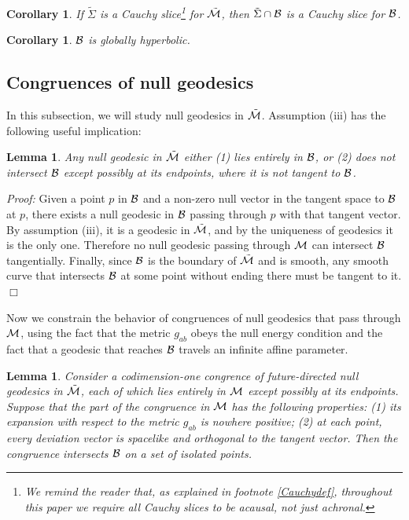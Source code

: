 \documentclass[12pt]{article}
\def\bulk{{\cal M}}
\def\bdy{{\cal B}}
\def\overM{\tilde \bulk}
\newtheorem{lemma}[theorem]{Lemma}
\newtheorem{corollary}[theorem]{Corollary}
\begin{document}
\begin{corollary}\label{boundaryCauchy} If $\tilde\Sigma$ is a Cauchy slice\footnote{ We remind the reader that, as explained in footnote \ref{Cauchydef}, throughout this paper we require all Cauchy slices to be acausal, not just achronal.} for $\overM$, then $\tilde\Sigma\cap\bdy$ is a Cauchy slice for $\bdy$.\end{corollary}

\begin{corollary}$\bdy$ is globally hyperbolic.\label{MdotGH}\end{corollary}

\subsection{Congruences of null geodesics}
\label{sec:pnullcong}

In this subsection, we will study null geodesics in $\overM$. Assumption (iii) has the following useful implication:
\begin{lemma}\label{nullgeo}Any null geodesic in $\overM$ either (1) lies entirely in $\bdy$, or (2) does not intersect $\bdy$ except possibly at its endpoints, where it is not tangent to $\bdy$.\end{lemma}

\emph{Proof:} Given a point $p$ in $\bdy$ and a non-zero null vector in the tangent space to $\bdy$ at $p$, there exists a null geodesic in $\bdy$ passing through $p$ with that tangent vector. By assumption (iii), it is a geodesic in $\overM$, and by the uniqueness of geodesics it is the only one. Therefore no null geodesic passing through $\bulk$ can intersect $\bdy$ tangentially. Finally, since $\bdy$ is the boundary of $\overM$ and is smooth, any smooth curve that intersects $\bdy$ at some point without ending there must be tangent to it. $\Box$\bigskip

Now we constrain the behavior of congruences of null geodesics that pass through $\bulk$, using the fact that the metric $g_{ab}$ obeys the null energy condition and the fact that a geodesic that reaches $\bdy$ travels an infinite affine parameter.

\begin{lemma}\label{point}Consider a codimension-one congrence of future-directed null geodesics in $\overM$, each of which lies entirely in $\bulk$ except possibly at its endpoints. Suppose that the part of the congruence in $\bulk$ has the following properties: (1) its expansion with respect to the metric $g_{ab}$ is nowhere positive; (2) at each point, every deviation vector is spacelike and orthogonal to the tangent vector. Then the congruence intersects $\bdy$ on a set of isolated points.\end{lemma}
\end{document}

